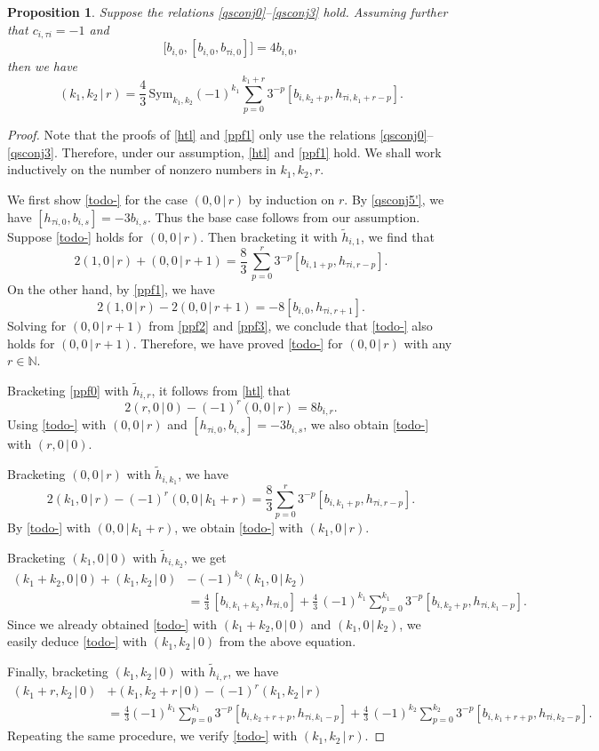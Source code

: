 \documentclass[11pt,reqno]{amsart}
\numberwithin{equation}{section}
\newtheorem{prop}[thm]{Proposition}
\theoremstyle{definition}
\theoremstyle{remark}
\newcommand{\beq}{\begin{equation}}
\newcommand{\eeq}{\end{equation}}
\newcommand{\bN}{\mathbb{N}}
\newcommand{\tl}{\tilde}
\begin{document}
\begin{prop}\label{prop-serre}
Suppose the relations \eqref{qsconj0}--\eqref{qsconj3} hold. Assuming further that $c_{i,\tau i}=-1$ and 
\beq\label{ppf0}
\big[b_{i,0},[b_{i,0},b_{\tau i,0}]\big]=4b_{i,0},
\eeq
then we have
\beq\label{todo-}
(k_1,k_2\,|\,r)=\frac{4}{3}\,\mathrm{Sym}_{k_1,k_2}(-1)^{k_1}\sum_{p=0}^{k_1+r}3^{-p}[b_{i,k_2+p},h_{\tau i,k_1+r-p}].
\eeq
\end{prop}
\begin{proof}
Note that the proofs of \eqref{htl} and \eqref{ppf1} only use the relations \eqref{qsconj0}--\eqref{qsconj3}. Therefore, under our assumption, \eqref{htl} and \eqref{ppf1} hold. We shall work inductively on the number of nonzero numbers in $k_1,k_2,r$.

We first show \eqref{todo-} for the case $(0,0\,|\,r)$ by induction on $r$. By \eqref{qsconj5'}, we have $[h_{\tau i,0},b_{i,s}]=-3b_{i,s}$. Thus the base case follows from our assumption. Suppose \eqref{todo-} holds for $(0,0\,|\,r)$. Then bracketing it with $\tl h_{i,1}$, we find that
\beq\label{ppf2}
2(1,0\,|\,r)+(0,0\,|\,r+1)=\frac{8}{3}\,\sum_{p=0}^{r}3^{-p}[b_{i,1+p},h_{\tau i,r-p}].
\eeq
On the other hand, by \eqref{ppf1}, we have
\beq\label{ppf3}
2(1,0\,|\,r)-2(0,0\,|\,r+1)=-8[b_{i,0},h_{\tau i,r+1}].
\eeq
Solving for $(0,0\,|\,r+1)$ from \eqref{ppf2} and \eqref{ppf3}, we conclude that \eqref{todo-} also holds for $(0,0\,|\,r+1)$. Therefore, we have proved \eqref{todo-} for $(0,0\,|\,r)$ with any $r\in\bN$.

Bracketing \eqref{ppf0} with $\tl h_{i,r}$, it follows from \eqref{htl} that
\[
2(r,0\,|\,0)-(-1)^r(0,0\,|\,r)=8b_{i,r}.
\]
Using \eqref{todo-} with $(0,0\,|\,r)$ and $[h_{\tau i,0},b_{i,s}]=-3b_{i,s}$, we also obtain \eqref{todo-} with $(r,0\,|\,0)$.

Bracketing $(0,0\,|\,r)$ with $\tl h_{i,k_1}$, we have
\[
2(k_1,0\,|\,r)-(-1)^r(0,0\,|\,k_1+r)=\frac{8}{3}\sum_{p=0}^{r}3^{-p}[b_{i,k_1+p},h_{\tau i,r-p}].
\]
By \eqref{todo-} with $(0,0\,|\,k_1+r)$, we obtain \eqref{todo-} with $(k_1,0\,|\,r)$.

Bracketing $(k_1,0\,|\,0)$ with $\tl h_{i,k_2}$, we get
\begin{align*}
(k_1+k_2,0\,|\,0)+(k_1,k_2\,|\,0)&-(-1)^{k_2}(k_1,0\,|\,k_2)\\
&=\frac{4}{3}\,[b_{i,k_1+k_2},h_{\tau i,0}]+\frac{4}{3}\,(-1)^{k_1}\sum_{p=0}^{k_1}3^{-p}[b_{i,k_2+p},h_{\tau i,k_1-p}].
\end{align*}
Since we already obtained \eqref{todo-} with $(k_1+k_2,0\,|\,0)$ and $(k_1,0\,|\,k_2)$, we easily deduce \eqref{todo-} with $(k_1,k_2\,|\,0)$ from the above equation.

Finally, bracketing $(k_1,k_2\,|\,0)$ with $\tl h_{i,r}$, we have
\begin{align*}
(k_1+r,k_2\,|\,0)&+(k_1,k_2+r\,|\,0)-(-1)^{r}(k_1,k_2\,|\,r)\\
&=\frac{4}{3}(-1)^{k_1}\sum_{p=0}^{k_1}3^{-p}[b_{i,k_2+r+p},h_{\tau i,k_1-p}]+\frac{4}{3}\,(-1)^{k_2}\sum_{p=0}^{k_2}3^{-p}[b_{i,k_1+r+p},h_{\tau i,k_2-p}].
\end{align*}
Repeating the same procedure, we verify \eqref{todo-} with $(k_1,k_2\,|\,r)$.
\end{proof}
\end{document}
